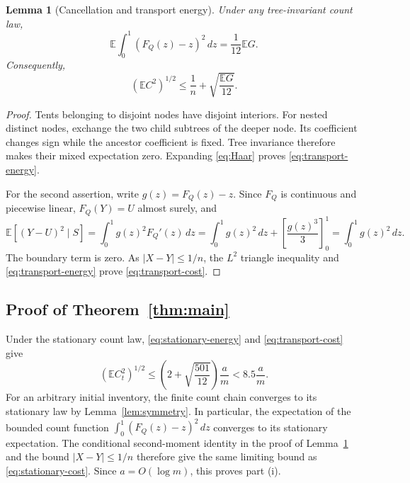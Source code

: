 \documentclass[11pt]{article}
\numberwithin{equation}{section}
\newtheorem{lemma}[theorem]{Lemma}
\theoremstyle{remark}
\newcommand{\E}{\mathbb E}
\begin{document}
\begin{lemma}[Cancellation and transport energy]\label{lem:transport-energy}
Under any tree-invariant count law,
\begin{equation}\label{eq:transport-energy}
\E\int_0^1(F_Q(z)-z)^2\,dz=\frac1{12}\E G.
\end{equation}
Consequently,
\begin{equation}\label{eq:transport-cost}
(\E C^2)^{1/2}\le\frac1n+\sqrt{\frac{\E G}{12}}.
\end{equation}
\end{lemma}
\begin{proof}
Tents belonging to disjoint nodes have disjoint interiors. For nested
distinct nodes, exchange the two child subtrees of the deeper node. Its
coefficient changes sign while the ancestor coefficient is fixed. Tree
invariance therefore makes their mixed expectation zero. Expanding
\eqref{eq:Haar} proves \eqref{eq:transport-energy}.


For the second assertion, write \(g(z)=F_Q(z)-z\). Since \(F_Q\) is
continuous and piecewise linear, \(F_Q(Y)=U\) almost surely, and
\[
\E[(Y-U)^2\mid S]
=\int_0^1g(z)^2F_Q'(z)\,dz
=\int_0^1g(z)^2\,dz+\left[\frac{g(z)^3}{3}\right]_0^1
=\int_0^1g(z)^2\,dz.
\]
The boundary term is zero. As \(|X-Y|\le1/n\), the \(L^2\) triangle
inequality and \eqref{eq:transport-energy} prove
\eqref{eq:transport-cost}.
\end{proof}


\subsection{Proof of Theorem~\ref{thm:main}}\label{sec:finite}

Under the stationary count law, \eqref{eq:stationary-energy} and
\eqref{eq:transport-cost} give
\begin{equation}\label{eq:stationary-cost}
(\E C_t^2)^{1/2}
\le\left(2+\sqrt{\frac{501}{12}}\right)\frac am
<8.5\frac am.
\end{equation}
For an arbitrary initial inventory, the finite count chain converges to
its stationary law by Lemma~\ref{lem:symmetry}. In particular, the
expectation of the bounded count function
\(\int_0^1(F_Q(z)-z)^2\,dz\) converges to its stationary expectation.
The conditional second-moment identity in the proof of
Lemma~\ref{lem:transport-energy} and the bound \(|X-Y|\le1/n\)
therefore give the same limiting bound as \eqref{eq:stationary-cost}.
Since \(a=O(\log m)\), this proves part (i).
\end{document}

